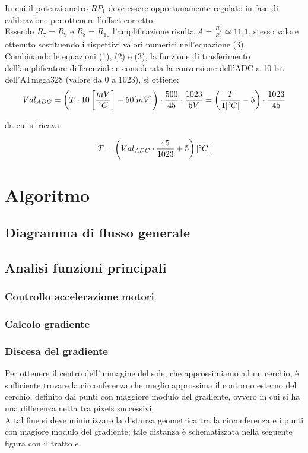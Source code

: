 \documentclass[12pt]{article}
\begin{document}
        In cui il potenziometro $RP_1$ deve essere opportunamente regolato in fase di calibrazione per ottenere l'offset corretto.\\
        Essendo $R_7=R_9$ e $R_8=R_{10}$ l'amplificazione risulta $A = \frac{R_7}{R_8} \simeq 11.1$, stesso valore ottenuto sostituendo i rispettivi valori numerici nell'equazione (3).\\
        Combinando le equazioni (1), (2) e (3), la funzione di trasferimento dell'amplificatore differenziale e considerata la conversione dell'ADC a 10 bit dell'ATmega328 (valore da 0 a 1023), si ottiene:
        \begin{equation}
            Val_{ADC} = \left( T \cdot 10 \left[ \frac{mV}{\degree C} \right] - 50 [mV] \right) \cdot \frac{500}{45} \cdot \frac{1023}{5V} = \left( \frac{T}{1 [\degree C]} - 5 \right) \cdot  \frac{1023}{45}
        \end{equation}
        
        \noindent
        da cui si ricava
        
        \begin{equation}
            T = \left( Val_{ADC} \cdot \frac{45}{1023} + 5 \right) [\degree C]
        \end{equation}
    
\vspace{1cm}

\section{Algoritmo}
    \subsection{Diagramma di flusso generale}

    \subsection{Analisi funzioni principali}
        \subsubsection{Controllo accelerazione motori}
        \subsubsection{Calcolo gradiente}
        
        
        \subsubsection{Discesa del gradiente}
        Per ottenere il centro dell'immagine del sole, che approssimiamo ad un cerchio, è sufficiente trovare la circonferenza che meglio approssima il contorno esterno del cerchio, definito dai punti con maggiore modulo del gradiente, ovvero in cui si ha una differenza netta tra pixels successivi. \\
        A tal fine si deve minimizzare la distanza geometrica tra la circonferenza e i punti con magiore modulo del gradiente; tale distanza è schematizzata nella seguente figura con il tratto $ e $.
        
\end{document}
